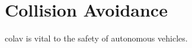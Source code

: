 \section{Collision Avoidance}
\label{sec:background_colav}

\Gls{colav} is vital to the safety of autonomous vehicles.
